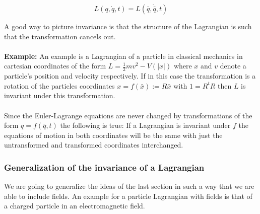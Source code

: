 \documentclass{article}
\begin{document}
\begin{equation} \label{defInvarianceLagrange2}
L(q,\dot{q},t) = L(\bar{q},\dot{\bar{q}},t)
\end{equation}

A good way to picture invariance is that the structure of the Lagrangian is such that the transformation cancels out.
\\ \\
\textbf{Example:}
An example is a Lagrangian of a particle in classical mechanics in cartesian coordinates of the form $L=\frac{1}{2}m v^2 - V(|x|)$ where $x$ and $v$ denote a particle's position and velocity respectively.
If in this case the transformation is a rotation of the particles coordinates $x = f(\bar{x}) := R\bar{x}$ with $1 = R^tR $ then $L$ is invariant under this transformation.
\\ \\
Since the Euler-Lagrange equations are never changed by transformations of the form $q=f(\bar{q},t)$ the following is true:
If a Lagrangian is invariant under $f$ the equations of motion in both coordinates will be the same with just the untransformed and transformed coordinates interchanged.

\subsubsection{Generalization of the invariance of a Lagrangian} \label{sectionGeneralizationInvariance}
We are going to generalize the ideas of the last section in such a way that we are able to include fields.
An example for a particle Lagrangian with fields is that of a charged particle in an electromagnetic field.
\end{document}
